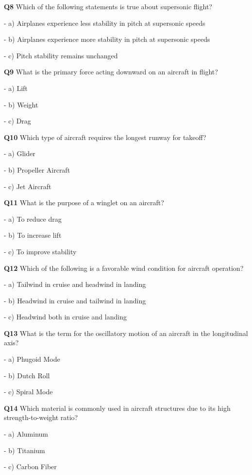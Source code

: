 \textbf{Q8} Which of the following statements is true about supersonic flight?\par
\quad - a) Airplanes experience less stability in pitch at supersonic speeds\par
\quad - b) Airplanes experience more stability in pitch at supersonic speeds\par
\quad - c) Pitch stability remains unchanged\par

\textbf{Q9} What is the primary force acting downward on an aircraft in flight?\par
\quad - a) Lift\par
\quad - b) Weight\par
\quad - c) Drag\par

\textbf{Q10} Which type of aircraft requires the longest runway for takeoff?\par
\quad - a) Glider\par
\quad - b) Propeller Aircraft\par
\quad - c) Jet Aircraft\par

\textbf{Q11} What is the purpose of a winglet on an aircraft?\par
\quad - a) To reduce drag\par
\quad - b) To increase lift\par
\quad - c) To improve stability\par

\textbf{Q12} Which of the following is a favorable wind condition for aircraft operation?\par
\quad - a) Tailwind in cruise and headwind in landing\par
\quad - b) Headwind in cruise and tailwind in landing\par
\quad - c) Headwind both in cruise and landing\par

\textbf{Q13} What is the term for the oscillatory motion of an aircraft in the longitudinal axis?\par
\quad - a) Phugoid Mode\par
\quad - b) Dutch Roll\par
\quad - c) Spiral Mode\par

\textbf{Q14} Which material is commonly used in aircraft structures due to its high strength-to-weight ratio?\par
\quad - a) Aluminum\par
\quad - b) Titanium\par
\quad - c) Carbon Fiber\par


